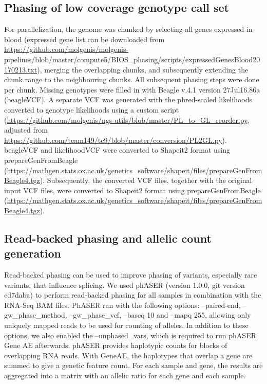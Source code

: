 {{\subsection{Phasing of low coverage genotype call set}
For parallelization, the genome was chunked by selecting all genes expressed in blood (expressed gene list can be downloaded from \url{https://github.com/molgenis/molgenis-pipelines/blob/master/compute5/BIOS\_phasing/scripts/expressedGenesBlood20170213.txt}), merging the overlapping chunks, and subsequently extending the chunk range to the neighbouring chunks. All subsequent phasing steps were done per chunk. Missing genotypes were filled in with Beagle\cite{browningGenotypeImputationMillions2016} v.4.1 version 27Jul16.86a (beagleVCF). A separate VCF was generated with the phred-scaled likelihoods converted to genotype likelihoods using a custom script (\url{https://github.com/molgenis/ngs-utils/blob/master/PL\_to\_GL\_reorder.py}, adjusted from \url{https://github.com/team149/tc9/blob/master/conversion/PL2GL.py}). beagleVCF and likelihoodVCF were converted to Shapeit2 format using prepareGenFromBeagle \url{(https://mathgen.stats.ox.ac.uk/genetics\_software/shapeit/files/prepareGenFromBeagle4.tgz}). Subsequently, the converted VCF files, together with the original input VCF files, were converted to Shapeit2 format using prepareGenFromBeagle (\url{https://mathgen.stats.ox.ac.uk/genetics\_software/shapeit/files/prepareGenFromBeagle4.tgz}).
	
\subsection{Read-backed phasing and allelic count generation}
Read-backed phasing can be used to improve phasing of variants, especially rare variants, that influence splicing. We used phASER\cite{castelRareVariantPhasing2016} (version 1.0.0, git version cd7daba) to perform read-backed phasing for all samples in combination with the RNA-Seq BAM files. PhASER ran with the following options: --paired-end, --gw\_phase\_method, --gw\_phase\_vcf, --baseq 10 and --mapq 255, allowing only uniquely mapped reads to be used for counting of alleles. In addition to these options, we also enabled the --unphased\_vars, which is required to run phASER Gene AE afterwards.
phASER provides haplotypic counts for blocks of overlapping RNA reads. With GeneAE, the haplotypes that overlap a gene are summed to give a genetic feature count. For each sample and gene, the results are aggregated into a matrix with an allelic ratio for each gene and each sample. 

}}
